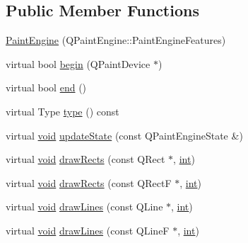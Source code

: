\subsection*{Public Member Functions}
\begin{DoxyCompactItemize}
\item 
\hyperlink{class_qwt_null_paint_device_1_1_paint_engine_a57f4834acae5ff727a1f7fb46579b8fa}{Paint\-Engine} (Q\-Paint\-Engine\-::\-Paint\-Engine\-Features)
\item 
virtual bool \hyperlink{class_qwt_null_paint_device_1_1_paint_engine_af9354291b64bff5762c897115083189f}{begin} (Q\-Paint\-Device $\ast$)
\item 
virtual bool \hyperlink{class_qwt_null_paint_device_1_1_paint_engine_a1e41d7ab09811fcb56c8d9505964a124}{end} ()
\item 
virtual Type \hyperlink{class_qwt_null_paint_device_1_1_paint_engine_a74d5637ff7ad7b8aa47dea3fd3acca9c}{type} () const 
\item 
virtual \hyperlink{group___u_a_v_objects_plugin_ga444cf2ff3f0ecbe028adce838d373f5c}{void} \hyperlink{class_qwt_null_paint_device_1_1_paint_engine_a46a9e86b63dd00c4faa45507b085aa8f}{update\-State} (const Q\-Paint\-Engine\-State \&)
\item 
virtual \hyperlink{group___u_a_v_objects_plugin_ga444cf2ff3f0ecbe028adce838d373f5c}{void} \hyperlink{class_qwt_null_paint_device_1_1_paint_engine_a2e52c75ab1945bddcb71a97fab988678}{draw\-Rects} (const Q\-Rect $\ast$, \hyperlink{ioapi_8h_a787fa3cf048117ba7123753c1e74fcd6}{int})
\item 
virtual \hyperlink{group___u_a_v_objects_plugin_ga444cf2ff3f0ecbe028adce838d373f5c}{void} \hyperlink{class_qwt_null_paint_device_1_1_paint_engine_a58d16cb536b7a5754186db08d7f5d802}{draw\-Rects} (const Q\-Rect\-F $\ast$, \hyperlink{ioapi_8h_a787fa3cf048117ba7123753c1e74fcd6}{int})
\item 
virtual \hyperlink{group___u_a_v_objects_plugin_ga444cf2ff3f0ecbe028adce838d373f5c}{void} \hyperlink{class_qwt_null_paint_device_1_1_paint_engine_a72879a585523737f9253e28f2e82ddf3}{draw\-Lines} (const Q\-Line $\ast$, \hyperlink{ioapi_8h_a787fa3cf048117ba7123753c1e74fcd6}{int})
\item 
virtual \hyperlink{group___u_a_v_objects_plugin_ga444cf2ff3f0ecbe028adce838d373f5c}{void} \hyperlink{class_qwt_null_paint_device_1_1_paint_engine_a9d39053ac321a0f37c6c1ec2d5690b16}{draw\-Lines} (const Q\-Line\-F $\ast$, \hyperlink{ioapi_8h_a787fa3cf048117ba7123753c1e74fcd6}{int})
\item 

\end{DoxyCompactItemize}
